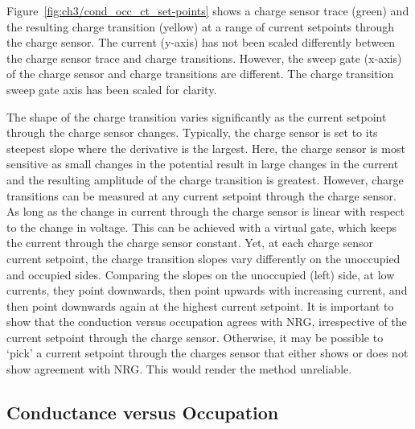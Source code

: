 Figure~\ref{fig:ch3/cond_occ_ct_set-points} shows a charge sensor trace (green) and the resulting charge transition (yellow) at a range of current setpoints through the charge sensor. The current (y-axis) has not been scaled differently between the charge sensor trace and charge transitions. However, the sweep gate (x-axis) of the charge sensor and charge transitions are different. The charge transition sweep gate axis has been scaled for clarity. 



The shape of the charge transition varies significantly as the current setpoint through the charge sensor changes. Typically, the charge sensor is set to its steepest slope where the derivative is the largest. Here, the charge sensor is most sensitive as small changes in the potential result in large changes in the current and the resulting amplitude of the charge transition is greatest. However, charge transitions can be measured at any current setpoint through the charge sensor. As long as the change in current through the charge sensor is linear with respect to the change in voltage. This can be achieved with a virtual gate, which keeps the current through the charge sensor constant. Yet, at each charge sensor current setpoint, the charge transition slopes vary differently on the unoccupied and occupied sides. Comparing the slopes on the unoccupied (left) side, at low currents, they point downwards, then point upwards with increasing current, and then point downwards again at the highest current setpoint. It is important to show that the conduction versus occupation agrees with NRG, irrespective of the current setpoint through the charge sensor. Otherwise, it may be possible to `pick' a current setpoint through the charges sensor that either shows or does not show agreement with NRG. This would render the method unreliable. 




\subsection{Conductance versus Occupation}



